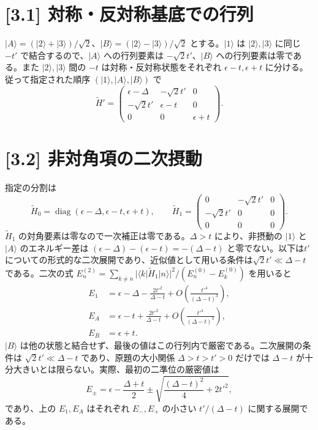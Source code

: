 \documentclass[11pt,a4paper]{article}
\begin{document}
\section*{[3.1] 対称・反対称基底での行列}
$|A\rangle=(|2\rangle+|3\rangle)/\sqrt2$、$|B\rangle=(|2\rangle-|3\rangle)/\sqrt2$ とする。$|1\rangle$ は $|2\rangle,|3\rangle$ に同じ $-t'$ で結合するので、$|A\rangle$ への行列要素は $-\sqrt2t'$、$|B\rangle$ への行列要素は零である。また $|2\rangle,|3\rangle$ 間の $-t$ は対称・反対称状態をそれぞれ $\epsilon-t,\epsilon+t$ に分ける。従って指定された順序 $(|1\rangle,|A\rangle,|B\rangle)$ で
\begin{equation}
\boxed{\widetilde H'=
\begin{pmatrix}
\epsilon-\Delta&-\sqrt2t'&0\\
-\sqrt2t'&\epsilon-t&0\\
0&0&\epsilon+t
\end{pmatrix}}.
\end{equation}

\section*{[3.2] 非対角項の二次摂動}
指定の分割は
\begin{equation}
\widetilde H_0=\operatorname{diag}(\epsilon-\Delta,\epsilon-t,\epsilon+t),\qquad
\widetilde H_1=\begin{pmatrix}0&-\sqrt2t'&0\\-\sqrt2t'&0&0\\0&0&0\end{pmatrix}.
\end{equation}
$\widetilde H_1$ の対角要素は零なので一次補正は零である。$\Delta>t$ により、非摂動の $|1\rangle$ と $|A\rangle$ のエネルギー差は $(\epsilon-\Delta)-(\epsilon-t)=-(\Delta-t)$ と零でない。以下は$t'$についての形式的な二次展開であり、近似値として用いる条件は$\sqrt2t'\ll\Delta-t$である。二次の式 $E_n^{(2)}=\sum_{k\ne n}|\langle k|\widetilde H_1|n\rangle|^2/(E_n^{(0)}-E_k^{(0)})$ を用いると
\begin{align}
\boxed{E_{1}}&=\epsilon-\Delta-\frac{2t'^2}{\Delta-t}+O\!\left(\frac{t'^4}{(\Delta-t)^3}\right),\\
\boxed{E_{A}}&=\epsilon-t+\frac{2t'^2}{\Delta-t}+O\!\left(\frac{t'^4}{(\Delta-t)^3}\right),\\
\boxed{E_{B}}&=\epsilon+t.
\end{align}
$|B\rangle$ は他の状態と結合せず、最後の値はこの行列内で厳密である。二次展開の条件は $\sqrt2t'\ll\Delta-t$ であり、原題の大小関係 $\Delta>t>t'>0$ だけでは $\Delta-t$ が十分大きいとは限らない。実際、最初の二準位の厳密値は
\begin{equation}
E_{\pm}=\epsilon-\frac{\Delta+t}{2}
\pm\sqrt{\frac{(\Delta-t)^2}{4}+2t'^2},
\end{equation}
であり、上の $E_1,E_A$ はそれぞれ $E_-,E_+$ の小さい $t'/(\Delta-t)$ に関する展開である。
\end{document}
